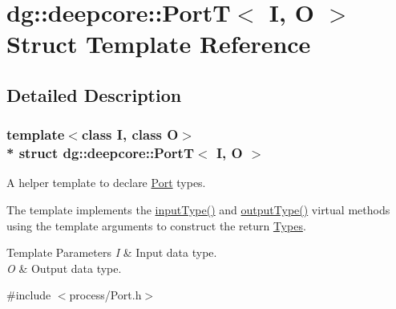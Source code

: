 \hypertarget{structdg_1_1deepcore_1_1_port_t}{}\section{dg\+:\+:deepcore\+:\+:PortT$<$ I, O $>$ Struct Template Reference}
\label{structdg_1_1deepcore_1_1_port_t}


\subsection{Detailed Description}
\subsubsection*{template$<$class I, class O$>$\\*
struct dg\+::deepcore\+::\+Port\+T$<$ I, O $>$}

A helper template to declare \hyperlink{classdg_1_1deepcore_1_1_port}{Port} types. 

The template implements the \hyperlink{structdg_1_1deepcore_1_1_port_t_abeb153653191a5b4e6f4d16a285dbac4}{input\+Type()} and \hyperlink{structdg_1_1deepcore_1_1_port_t_abbf359eaba346394c9f63af855153899}{output\+Type()} virtual methods using the template arguments to construct the return \hyperlink{classdg_1_1deepcore_1_1_type}{Types}.


\begin{DoxyTemplParams}{Template Parameters}
{\em I} & Input data type. \\
\hline
{\em O} & Output data type. \\
\hline
\end{DoxyTemplParams}


{\ttfamily \#include $<$process/\+Port.\+h$>$}



